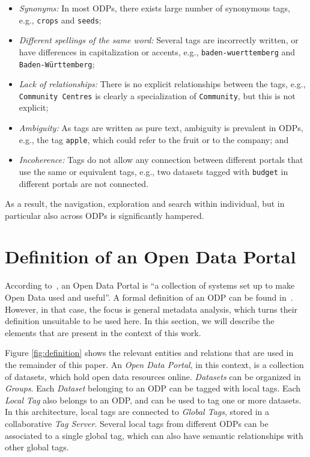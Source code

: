\begin{itemize}
	\item \emph{Synonyms:} In most ODPs, there exists large number of synonymous tags, e.g., \texttt{crops} and \texttt{seeds};
	\item \emph{Different spellings of the same word:} Several tags are incorrectly written, or have differences in capitalization or accents, e.g., \texttt{baden-wuerttemberg} and \texttt{Baden-W\"{u}rttemberg};
	\item \emph{Lack of relationships:} There is no explicit relationships between the tags, e.g., \texttt{Community Centres} is clearly a specialization of \texttt{Community}, but this is not explicit;
	\item \emph{Ambiguity:} As tags are written as pure text, ambiguity is prevalent in ODPs, e.g., the tag \texttt{apple}, which could refer to the fruit or to the company; and
	\item \emph{Incoherence:} Tags do not allow any connection between different portals that use the same or equivalent tags, e.g., two datasets tagged with \texttt{budget} in different portals are not connected.
\end{itemize}

As a result, the navigation, exploration and search within individual, but in particular also across ODPs is significantly hampered.

\section{Definition of an Open Data Portal}
\label{sec:definition} 

According to~, an Open Data Portal is ``a collection of systems set up to make Open Data used and useful''.
A formal definition of an ODP can be found in~.
However, in that case, the focus is general metadata analysis, which turns their definition unsuitable to be used here. 
In this section, we will describe the elements that are present in the context of this work.

Figure \ref{fig:definition} shows the relevant entities and relations that are used in the remainder of this paper.
An \emph{Open Data Portal}, in this context, is a collection of datasets, which hold open data resources online.
\emph{Datasets} can be organized in \emph{Groups}.
Each \emph{Dataset} belonging to an ODP can be tagged with local tags. 
Each \emph{Local Tag} also belongs to an ODP, and can be used to tag one or more datasets.
In this architecture, local tags are connected to \emph{Global Tags}, stored in a collaborative \emph{Tag Server}.
Several local tags from different ODPs can be associated to a single global tag, which can also have semantic relationships with other global tags.

